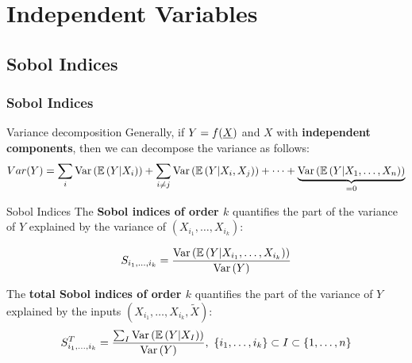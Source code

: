 \documentclass[8pt]{beamer}
\begin{document}
\section{Independent Variables }



\subsection{Sobol Indices}


\begin{frame}
\frametitle{Sobol Indices}
\small

\begin{block}{Variance decomposition}
Generally, if $Y=f({\underline{X}})$ and $X$ with {\bf independent components}, then we can decompose the variance as follows: 
\begin{equation}
\label{decompVar}
Var(Y) = \sum_i \mbox{Var}\left( \mathbb{E}\left( Y|X_i \right) \right) + \sum_{i \neq j} \mbox{Var}\left( \mathbb{E}\left( Y|X_i,X_j \right) \right) + \dots + \underbrace{\mbox{Var}\left( \mathbb{E}\left( Y|X_1,\dots, X_n \right) \right)}_{=0}
\end{equation}
\end{block}


\begin{block}{Sobol Indices}
The \alert{\bf Sobol indices of order $k$} quantifies the part of the variance of $Y$ explained by the variance of $(X_{i_1},\dots, X_{i_k})$:

\begin{equation}
\label{SobolOrdrek}
\displaystyle S_{i_1, \dots, i_k} =\frac{\mbox{Var}\left( \mathbb{E}\left( Y|X_{i_1}, \dots, X_{i_k} \right) \right)}{\mbox{Var}\left( Y \right)}
\end{equation}

The \alert{\bf total Sobol indices of order $k$} quantifies the part of the variance of $Y$ explained by the inputs $(X_{i_1},\dots, X_{i_k}, \tilde{X})$:
\begin{equation}
\label{SobolTotalOrdrek}
\displaystyle S^T_{i_1, \dots, i_k} =\frac{\sum_I\mbox{Var}\left( \mathbb{E}\left( Y|X_{I} \right) \right)}{\mbox{Var}\left( Y \right)},\, \, \{i_1, \dots, i_k\} \subset I\subset \{1, \dots, n \}
\end{equation}

\end{block}
\end{frame}
\end{document}
